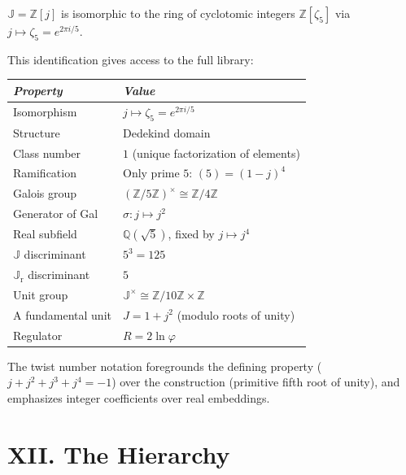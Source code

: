 \documentclass[11pt, a4paper]{article}
\newcommand{\ph}{\varphi}
\newcommand{\TT}{\mathbb{J}}
\newcommand{\TTr}{\mathbb{J}_{\mathrm{r}}}
\begin{document}
$\TT = \mathbb{Z}[j]$ is isomorphic to the ring of cyclotomic integers $\mathbb{Z}[\zeta_5]$ via $j \mapsto \zeta_5 = e^{2\pi i/5}$.

This identification gives access to the full library:

\renewcommand{\arraystretch}{1.4}
\begin{tabularx}{\textwidth}{LL}
\toprule
\textit{Property} & \textit{Value} \\
\midrule
Isomorphism & $j \mapsto \zeta_5 = e^{2\pi i/5}$ \\[0.2em]
Structure & Dedekind domain \\[0.2em]
Class number & $1$ (unique factorization of elements) \\[0.2em]
Ramification & Only prime $5$: $(5) = (1-j)^4$ \\[0.2em]
Galois group & $(\mathbb{Z}/5\mathbb{Z})^\times \cong \mathbb{Z}/4\mathbb{Z}$ \\[0.2em]
Generator of Gal & $\sigma: j \mapsto j^2$ \\[0.2em]
Real subfield & $\mathbb{Q}(\sqrt{5})$, fixed by $j \mapsto j^4$ \\[0.2em]
$\TT$ discriminant & $5^3 = 125$ \\[0.2em]
$\TTr$ discriminant & $5$ \\[0.2em]
Unit group & $\TT^\times \cong \mathbb{Z}/10\mathbb{Z} \times \mathbb{Z}$ \\[0.2em]
A fundamental unit & $J = 1 + j^2$ (modulo roots of unity) \\[0.2em]
Regulator & $R = 2\ln\ph$ \\
\bottomrule
\end{tabularx}

\vspace{0.5em}

The twist number notation foregrounds the defining property ($j + j^2 + j^3 + j^4 = -1$) over the construction (primitive fifth root of unity), and emphasizes integer coefficients over real embeddings.

\section*{XII. The Hierarchy}
\end{document}
